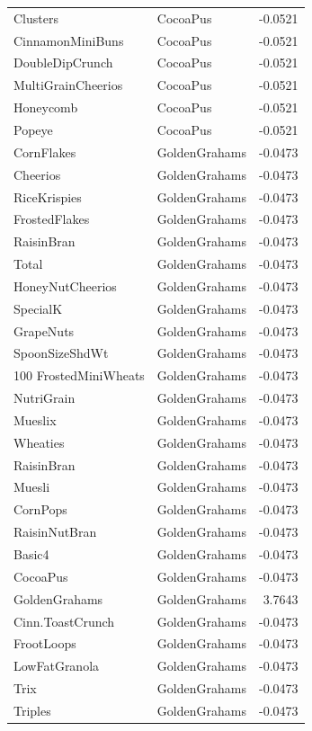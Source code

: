 \begin{longtable}{llr}
Clusters & CocoaPus & -0.0521 \\
CinnamonMiniBuns & CocoaPus & -0.0521 \\
DoubleDipCrunch & CocoaPus & -0.0521 \\
MultiGrainCheerios & CocoaPus & -0.0521 \\
Honeycomb & CocoaPus & -0.0521 \\
Popeye & CocoaPus & -0.0521 \\
CornFlakes & GoldenGrahams & -0.0473 \\
Cheerios & GoldenGrahams & -0.0473 \\
RiceKrispies & GoldenGrahams & -0.0473 \\
FrostedFlakes & GoldenGrahams & -0.0473 \\
RaisinBran & GoldenGrahams & -0.0473 \\
Total & GoldenGrahams & -0.0473 \\
HoneyNutCheerios & GoldenGrahams & -0.0473 \\
SpecialK & GoldenGrahams & -0.0473 \\
GrapeNuts & GoldenGrahams & -0.0473 \\
SpoonSizeShdWt & GoldenGrahams & -0.0473 \\
100%
FrostedMiniWheats & GoldenGrahams & -0.0473 \\
NutriGrain & GoldenGrahams & -0.0473 \\
Mueslix & GoldenGrahams & -0.0473 \\
Wheaties & GoldenGrahams & -0.0473 \\
RaisinBran & GoldenGrahams & -0.0473 \\
Muesli & GoldenGrahams & -0.0473 \\
CornPops & GoldenGrahams & -0.0473 \\
RaisinNutBran & GoldenGrahams & -0.0473 \\
Basic4 & GoldenGrahams & -0.0473 \\
CocoaPus & GoldenGrahams & -0.0473 \\
GoldenGrahams & GoldenGrahams & 3.7643 \\
Cinn.ToastCrunch & GoldenGrahams & -0.0473 \\
FrootLoops & GoldenGrahams & -0.0473 \\
LowFatGranola & GoldenGrahams & -0.0473 \\
Trix & GoldenGrahams & -0.0473 \\
Triples & GoldenGrahams & -0.0473 \\

\end{longtable}

